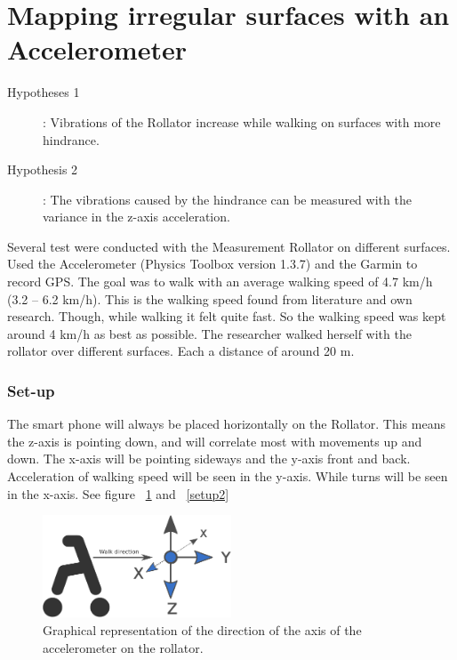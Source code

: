 


\section{Mapping irregular surfaces with an Accelerometer}
\begin{description}
\item[Hypotheses 1] : Vibrations of the Rollator increase while walking on surfaces with more hindrance. 
\item[Hypothesis 2] : The vibrations caused by the hindrance can be measured with the variance in the z-axis acceleration. 
\end{description}

Several test were conducted with the Measurement Rollator on different surfaces. Used the Accelerometer (Physics Toolbox version 1.3.7) and the Garmin to record GPS. The goal was to walk with an average walking speed of 4.7 km/h (3.2 – 6.2 km/h). This is the walking speed found from literature and own research. Though, while walking it felt quite fast. So the walking speed was kept around 4 km/h as best as possible. The researcher walked herself with the rollator over different surfaces. Each a distance of around 20 m. 

\subsubsection{Set-up}
The smart phone will always be placed horizontally on the Rollator. This means the z-axis is pointing down, and will correlate most with movements up and down. The x-axis will be pointing sideways and the y-axis front and back. Acceleration of walking speed will be seen in the y-axis. While turns will be seen in the x-axis. See figure ~\ref{setup} and ~\ref{setup2}

\begin{figure}[h]
\includegraphics[width=0.5\textwidth]{img/M_rollator_setup.pdf}
\centering
\caption{ Graphical representation of the direction of the axis of the accelerometer on the rollator. \label{setup}}
\end{figure}

